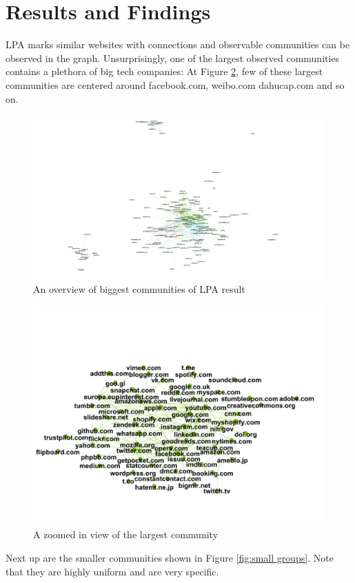 \documentclass[conference]{IEEEtran}
\begin{document}
\section{Results and Findings}

LPA marks similar websites with connections and observable communities can be observed in the graph. Unsurprisingly, one of the largest observed communities contains a plethora of big tech companies: At Figure \ref{fig:tech}, few of these largest communities are centered around facebook.com, weibo.com dahucap.com and so on.

\begin{figure}[htbp]
 \centerline{\includegraphics[width=\columnwidth]{figs/Huge.png}}
 \caption{An overview of biggest communities of LPA result}
 \label{fig:biggestCommunities}
\end{figure}

\begin{figure}[htbp]
 \centerline{\includegraphics[width=\columnwidth]{figs/google.png}}
 \caption{A zoomed in view of the largest community}
 \label{fig:tech}
\end{figure}
Next up are the smaller communities shown in Figure \ref{fig:small groups}. Note that they are highly uniform and are very specific.
\end{document}
